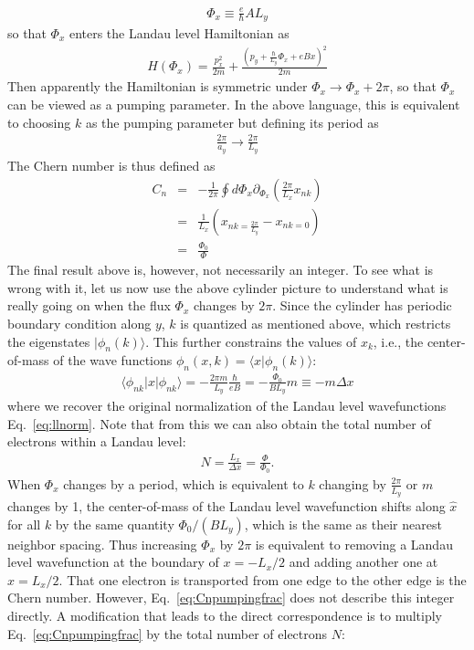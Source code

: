 \begin{eqnarray}
	\Phi_x \equiv \frac{e}{\hbar} A L_y
\end{eqnarray}
so that $\Phi_x$ enters the Landau level Hamiltonian as
\begin{eqnarray}
	H(\Phi_x) = \frac{p_x^2}{2m} + \frac{(p_y + \frac{\hbar}{L_y}\Phi_x + eBx)^2}{2m}
\end{eqnarray}
Then apparently the Hamiltonian is symmetric under $\Phi_x\rightarrow \Phi_x + 2\pi$, so that $\Phi_x$ can be viewed as a pumping parameter. In the above language, this is equivalent to choosing $k$ as the pumping parameter but defining its period as
\begin{eqnarray}
	\frac{2\pi}{a_y}\rightarrow \frac{2\pi}{L_y}
\end{eqnarray}
The Chern number is thus defined as
\begin{eqnarray}\label{eq:Cnpumpingfrac}
	C_n &=& - \frac{1}{2\pi}\oint d\Phi_x \partial_{\Phi_x} \left( \frac{2\pi}{L_x}x_{nk} \right)\\\nonumber
	&=&\frac{1}{L_x} \left(x_{n k = \frac{2\pi}{L_y}} - x_{nk = 0}\right)\\\nonumber
	&=& \frac{\Phi_0}{\Phi}
\end{eqnarray}
The final result above is, however, not necessarily an integer. To see what is wrong with it, let us now use the above cylinder picture to understand what is really going on when the flux $\Phi_x$ changes by $2\pi$. Since the cylinder has periodic boundary condition along $y$, $k$ is quantized as mentioned above, which restricts the eigenstates $|\phi_n(k)\rangle$. This further constrains the values of $x_k$, i.e., the center-of-mass of the wave functions $\phi_n(x,k) = \langle x| \phi_n(k)\rangle $:
\begin{eqnarray}
	\langle \phi_{nk}|x|\phi_{nk}\rangle = -\frac{2\pi m}{L_y}\frac{\hbar}{eB} = -\frac{\Phi_0}{BL_y}m \equiv -m \Delta x
\end{eqnarray}
where we recover the original normalization of the Landau level wavefunctions Eq.~\eqref{eq:llnorm}. Note that from this we can also obtain the total number of electrons within a Landau level:
\begin{eqnarray}
	N = \frac{L_x}{\Delta x} = \frac{\Phi}{\Phi_0}.
\end{eqnarray}
When $\Phi_x$ changes by a period, which is equivalent to $k$ changing by $\frac{2\pi}{L_y}$ or $m$ changes by 1, the center-of-mass of the Landau level wavefunction shifts along $\hat{x}$ for all $k$ by the same quantity $\Phi_0/(BL_y)$, which is the same as their nearest neighbor spacing. Thus increasing $\Phi_x$ by $2\pi$ is equivalent to removing a Landau level wavefunction at the boundary of $x = -L_x/2$ and adding another one at $x = L_x/2$. That one electron is transported from one edge to the other edge is the Chern number. However, Eq.~\eqref{eq:Cnpumpingfrac} does not describe this integer directly. A modification that leads to the direct correspondence is to multiply Eq.~\eqref{eq:Cnpumpingfrac} by the total number of electrons $N$:
